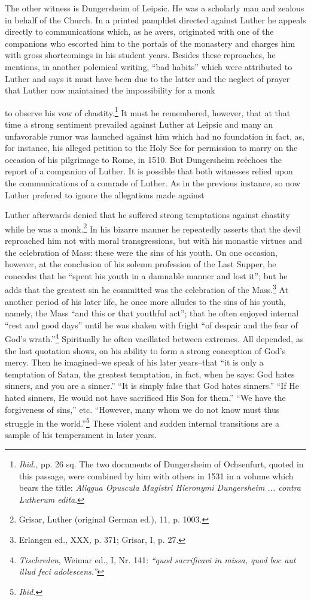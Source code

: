 The other witness is Dungersheim of Leipsic. He was a scholarly
man and zealous in behalf of the Church. In a printed pamphlet
directed against Luther he appeals directly to communications which,
as he avers, originated with one of the companions who escorted
him to the portals of the monastery and charges him with gross shortcomings
in his student years. Besides these reproaches, he mentions,
in another polemical writing, “bad habits” which were attributed
to Luther and says it must have been due to the latter and the neglect
of prayer that Luther now maintained the impossibility for a monk

to observe his vow of chastity.\footnote{\textit{Ibid.}, pp. 26 sq. The two documents of Dungersheim of Ochsenfurt, quoted in this passage, were combined by him with others in 1531 in a volume which bears the title: \textit{Aliqgua Opuscula Magistri Hieronymi Dungersheim ... contra Lutherum edita}.}
It must be remembered, however,
that at that time a strong sentiment prevailed against Luther at
Leipsic and many an unfavorable rumor was launched against him
which had no foundation in fact, as, for instance, his alleged petition
to the Holy See for permission to marry on the occasion of his
pilgrimage to Rome, in 1510. But Dungersheim reëchoes the report of
a companion of Luther. It is possible that both witnesses relied upon
the communications of a comrade of Luther. As in the previous instance,
so now Luther prefered to ignore the allegations made against

Luther afterwards denied that he suffered strong temptations
against chastity while he was a monk.\footnote{Grisar, Luther (original German ed.), 11, p. 1003.}
In his bizarre manner he
repeatedly asserts that the devil reproached him not with moral
transgressions, but with his monastic virtues and the celebration of
Mass: these were the sins of his youth. On one occasion, however,
at the conclusion of his solemn profession of the Last Supper, he
concedes that he “spent his youth in a damnable manner and lost
it”; but he adds that the greatest sin he committed was the celebration
of the Mass.\footnote{Erlangen ed., XXX, p. 371; Grisar, I, p. 27.}
At another period of his later life, he once
more alludes to the sins of his youth, namely, the Mass “and this
or that youthful act”; that he often enjoyed internal “rest and good
days” until he was shaken with fright “of despair and the fear of
God’s wrath.”\footnote{\textit{Tischreden}, Weimar ed., I, Nr. 141: \textit{``quod sacrificavi in missa, quod boc aut illud feci adolescens.''}}
Spiritually he often vacillated between extremes.
All depended, as the last quotation shows, on his ability to form
a strong conception of God’s mercy. Then he imagined--we speak of
his later years--that “it is only a temptation of Satan, the greatest
temptation, in fact, when he says: God hates sinners, and you are
a sinner.” “It is simply false that God hates sinners.” “If He hated
sinners, He would not have sacrificed His Son for them.” “We have
the forgiveness of sins,” etc. “However, many whom we do not
know must thus struggle in the world.”\footnote{\textit{Ibid.}}
These violent and sudden internal transitions are a sample of his temperament in later years.

